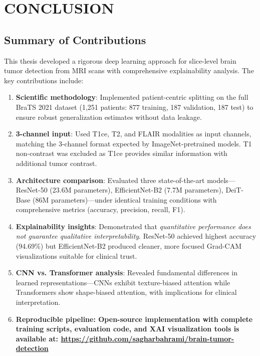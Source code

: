 \chapter{CONCLUSION}
\label{ch:conclusion}

\section{Summary of Contributions}

This thesis developed a rigorous deep learning approach for slice-level brain tumor detection from MRI scans with comprehensive explainability analysis. The key contributions include:

\begin{enumerate}
    \item \textbf{Scientific methodology}: Implemented patient-centric splitting on the full BraTS 2021 dataset (1,251 patients: 877 training, 187 validation, 187 test) to ensure robust generalization estimates without data leakage.

    \item \textbf{3-channel input}: Used T1ce, T2, and FLAIR modalities as input channels, matching the 3-channel format expected by ImageNet-pretrained models. T1 non-contrast was excluded as T1ce provides similar information with additional tumor contrast.

    \item \textbf{Architecture comparison}: Evaluated three state-of-the-art models---ResNet-50 (23.6M parameters), EfficientNet-B2 (7.7M parameters), DeiT-Base (86M parameters)---under identical training conditions with comprehensive metrics (accuracy, precision, recall, F1).

    \item \textbf{Explainability insights}: Demonstrated that \textit{quantitative performance does not guarantee qualitative interpretability}. ResNet-50 achieved highest accuracy (94.69\%) but EfficientNet-B2 produced cleaner, more focused Grad-CAM visualizations suitable for clinical trust.

    \item \textbf{CNN vs. Transformer analysis}: Revealed fundamental differences in learned representations---CNNs exhibit texture-biased attention while Transformers show shape-biased attention, with implications for clinical interpretation.

    \item \textbf{Reproducible pipeline: Open-source implementation with complete training scripts, evaluation code, and XAI visualization tools is available at: \url{https://github.com/sagharbahrami/brain-tumor-detection}}
\end{enumerate}

